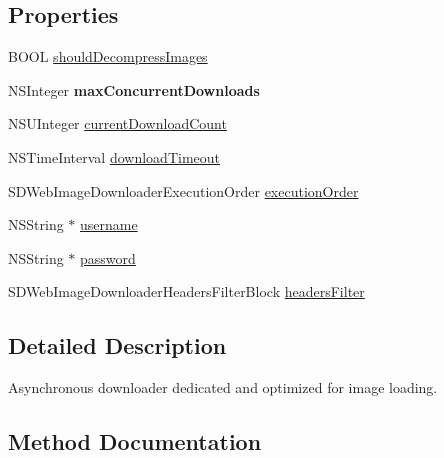 \subsection*{Properties}
\begin{DoxyCompactItemize}
\item 
B\+O\+O\+L \hyperlink{interface_s_d_web_image_downloader_ac91a3f91279023164c48bd066abbfbea}{should\+Decompress\+Images}
\item 
\hypertarget{interface_s_d_web_image_downloader_a6895c7acffd3bd3769a3c2f0e75e32f6}{}N\+S\+Integer {\bfseries max\+Concurrent\+Downloads}\label{interface_s_d_web_image_downloader_a6895c7acffd3bd3769a3c2f0e75e32f6}

\item 
N\+S\+U\+Integer \hyperlink{interface_s_d_web_image_downloader_a5fa5ece3c9fbec729d208f9901c6b711}{current\+Download\+Count}
\item 
N\+S\+Time\+Interval \hyperlink{interface_s_d_web_image_downloader_ab8353ea3b82be017001b01ac3577f52f}{download\+Timeout}
\item 
S\+D\+Web\+Image\+Downloader\+Execution\+Order \hyperlink{interface_s_d_web_image_downloader_a4f5cbec407970585eb0c08de1a0319fa}{execution\+Order}
\item 
N\+S\+String $\ast$ \hyperlink{interface_s_d_web_image_downloader_adec754b62354b9c84a190cd954a52aaa}{username}
\item 
N\+S\+String $\ast$ \hyperlink{interface_s_d_web_image_downloader_a12a536dd22cd02d2a6ef3588cc0a37d9}{password}
\item 
S\+D\+Web\+Image\+Downloader\+Headers\+Filter\+Block \hyperlink{interface_s_d_web_image_downloader_ae7594a7c9a621aaa6a27fdb72fcbae9b}{headers\+Filter}
\end{DoxyCompactItemize}


\subsection{Detailed Description}
Asynchronous downloader dedicated and optimized for image loading. 

\subsection{Method Documentation}
\hypertarget{interface_s_d_web_image_downloader_ac60cbbe2cfeb0ca230fa3e04e5f94015}{}
